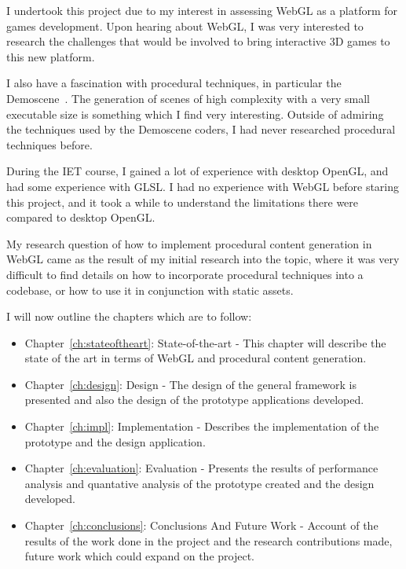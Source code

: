 I undertook this project due to my interest in assessing WebGL as a platform for games development.
Upon hearing about WebGL, I was very interested to research the challenges that would be involved to bring interactive 3D games to this new platform.

I also have a fascination with procedural techniques, in particular the Demoscene~\cite{web:demoscene4k}.
The generation of scenes of high complexity with a very small executable size is something which I find very interesting.
Outside of admiring the techniques used by the Demoscene coders, I had never researched procedural techniques before.

During the IET course, I gained a lot of experience with desktop OpenGL, and had some experience with GLSL.
I had no experience with WebGL before staring this project, and it took a while to understand the limitations there were compared to desktop OpenGL.

My research question of how to implement procedural content generation in WebGL came as the result of my initial research into the topic, where it was very difficult to find details on how to incorporate procedural techniques into a codebase, or how to use it in conjunction with static assets.

I will now outline the chapters which are to follow:
\begin{itemize}
	\item Chapter~\ref{ch:stateoftheart}: State-of-the-art - This chapter will describe the state of the art in terms of WebGL and procedural content generation.
	\item Chapter~\ref{ch:design}: Design - The design of the general framework is presented and also the design of the prototype applications developed.
	\item Chapter~\ref{ch:impl}: Implementation - Describes the implementation of the prototype and the design application.
	\item Chapter~\ref{ch:evaluation}: Evaluation - Presents the results of performance analysis and quantative analysis of the prototype created and the design developed.
	\item Chapter~\ref{ch:conclusions}: Conclusions And Future Work - Account of the results of the work done in the project and the research contributions made, future work which could expand on the project.
\end{itemize}
